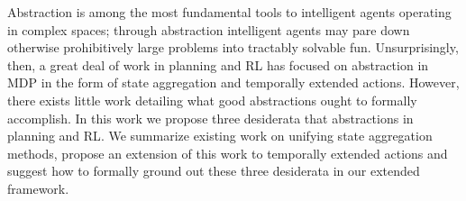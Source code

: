 Abstraction is among the most fundamental tools to intelligent agents operating in complex spaces; through abstraction intelligent agents may pare down otherwise prohibitively large problems into tractably solvable fun. Unsurprisingly, then, a great deal of work in planning and \ac{RL} has focused on abstraction in \ac{MDP} in the form of state aggregation and temporally extended actions. However, there exists little work detailing what good abstractions ought to formally accomplish. In this work we propose three desiderata that abstractions in planning and \ac{RL}. We summarize existing work on unifying state aggregation methods, propose an extension of this work to temporally extended actions and suggest how to formally ground out these three desiderata in our extended framework. 